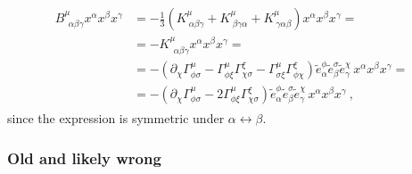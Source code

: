 \documentclass[letterpaper,10pt,english]{jupyterBook}
\begin{document}
\begin{equation*}
\begin{split}\begin{aligned}
  B^{\mu}_{\ \ \alpha \beta \gamma} x^\alpha x^\beta x^\gamma 
  & = - \frac{1}{3} \left( K^{\mu}_{\ \alpha \beta \gamma} + K^{\mu}_{\ \beta \gamma \alpha} + K^{\mu}_{\ \gamma \alpha \beta} \right) x^\alpha x^\beta x^\gamma = \\
  & = - K^{\mu}_{\ \ \alpha \beta \gamma} x^\alpha x^\beta x^\gamma = \\
  & = - \left( \partial_{\chi} \Gamma^{\mu}_{\phi \sigma} - \Gamma^{\mu}_{\phi \xi} \Gamma^{\xi}_{\chi \sigma} - \Gamma^{\mu}_{\sigma \xi} \Gamma^{\xi}_{\phi \chi} \right) \widetilde{e}^{\phi}_{\alpha} \widetilde{e}^{\sigma}_{\beta} \widetilde{e}^{\chi}_{\gamma} \, x^\alpha x^\beta x^\gamma = \\
  & = - \left( \partial_{\chi} \Gamma^{\mu}_{\phi \sigma} - 2 \Gamma^{\mu}_{\phi \xi} \Gamma^{\xi}_{\chi \sigma} \right) \widetilde{e}^{\phi}_{\alpha} \widetilde{e}^{\sigma}_{\beta} \widetilde{e}^{\chi}_{\gamma} \, x^\alpha x^\beta x^\gamma \ ,
\end{aligned}\end{split}
\end{equation*}
\sphinxAtStartPar
since the expression is symmetric under \(\alpha \leftrightarrow \beta\).
\subsubsection*{Old and likely wrong}
\end{document}
